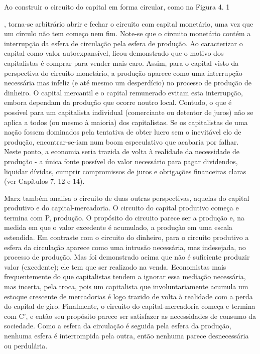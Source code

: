  \par 
Ao construir o circuito do capital em forma circular, como na Figura {\color{blue}4}. {\color{blue} 1 } {\par} , torna-se arbitrário abrir e fechar o circuito com capital monetário, uma vez que um círculo não tem começo nem fim. Note-se que o circuito monetário contém a interrupção da esfera de circulação pela esfera de produção. Ao caracterizar o capital como valor autoexpansível, ficou demonstrado que o motivo dos capitalistas é comprar para vender mais caro. Assim, para o capital visto da perspectiva do circuito monetário, a produção aparece como uma interrupção necessária mas infeliz (e até mesmo um desperdício) no processo de produção de dinheiro. O capital mercantil e o capital remunerado evitam esta interrupção, embora dependam da produção que ocorre noutro local. Contudo, o que é possível para um capitalista individual (comerciante ou detentor de juros) não se aplica a todos (ou mesmo à maioria) dos capitalistas. Se os capitalistas de uma nação fossem dominados pela tentativa de obter lucro sem o inevitável elo de produção, encontrar-se-iam num boom especulativo que acabaria por falhar. Neste ponto, a economia seria trazida de volta à realidade da necessidade de produção - a única fonte possível do valor necessário para pagar dividendos, liquidar dívidas, cumprir compromissos de juros e obrigações financeiras claras (ver Capítulos 7, {\color{blue}12} e {\color{blue}14}).
 \par 
Marx também analisa o circuito de duas outras perspectivas, aquelas do capital produtivo e do capital-mercadoria. O circuito do capital produtivo começa e termina com P, produção. O propósito do circuito parece ser a produção e, na medida em que o valor excedente é acumulado, a produção em uma escala estendida. Em contraste com o circuito do dinheiro, para o circuito produtivo a esfera da circulação aparece como uma intrusão necessária, mas indesejada, no processo de produção. Mas foi demonstrado acima que não é suficiente produzir valor (excedente); ele tem que ser realizado na venda. Economistas mais frequentemente do que capitalistas tendem a ignorar essa mediação necessária, mas incerta, pela troca, pois um capitalista que involuntariamente acumula um estoque crescente de mercadorias é logo trazido de volta à realidade com a perda do capital de giro. Finalmente, o circuito do capital-mercadoria começa e termina com C', e então seu propósito parece ser satisfazer as necessidades de consumo da sociedade. Como a esfera da circulação é seguida pela esfera da produção, nenhuma esfera é interrompida pela outra, então nenhuma parece desnecessária ou perdulária.
